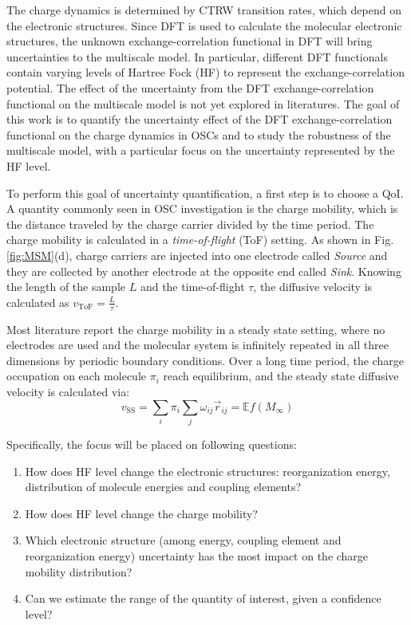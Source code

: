 \documentclass[letterpaper,12pt]{article}
\begin{document}
The charge dynamics is determined by CTRW transition rates, which depend on the electronic structures.
Since DFT is used to calculate the molecular electronic structures, the unknown exchange-correlation functional in DFT will bring uncertainties to the multiscale model. 
In particular, different DFT functionals contain varying levels of Hartree Fock (HF) to represent the exchange-correlation potential. 
The effect of the uncertainty from the DFT exchange-correlation functional on the multiscale model is not yet explored in literatures. 
The goal of this work is to quantify the uncertainty effect of the DFT exchange-correlation functional on the charge dynamics in OSCs and to study the robustness of the multiscale model, with a particular focus on the uncertainty represented by the HF level. 

To perform this goal of uncertainty quantification, a first step is to choose a QoI. A quantity commonly seen in OSC investigation is the charge mobility, which is the distance traveled by the charge carrier divided by the time period. 
The charge mobility is calculated in a \textit{time-of-flight} (ToF) setting. 
As shown in Fig.\ref{fig:MSM}(d), charge carriers are injected into one electrode called \textit{Source} and they are collected by another electrode at the opposite end called \textit{Sink}. 
Knowing the length of the sample $L$ and the time-of-flight $\tau$, the diffusive velocity is calculated as $v_\text{ToF}=\frac{L}{\tau}$.

Most literature report the charge mobility in a steady state setting, where no electrodes are used and the molecular system is infinitely repeated in all three dimensions by periodic boundary conditions. 
Over a long time period, the charge occupation on each molecule $\pi_i$ reach equilibrium, and the steady state diffusive velocity is calculated via:
\begin{equation}
    v_\text{SS} = \sum_i \pi_i \sum_j \omega_{ij} \vec{r}_{ij} = \mathbb{E}f(M_{\infty})
\end{equation} 

Specifically, the focus will be placed on following questions: 
\begin{enumerate}
    \item How does HF level change the electronic structures: reorganization energy, distribution of molecule energies and coupling elements? 
    \item How does HF level change the charge mobility?
    \item Which electronic structure (among energy, coupling element and reorganization energy) uncertainty has the most impact on the charge mobility distribution?
    \item Can we estimate the range of the quantity of interest, given a confidence level?
\end{enumerate}
\end{document}

